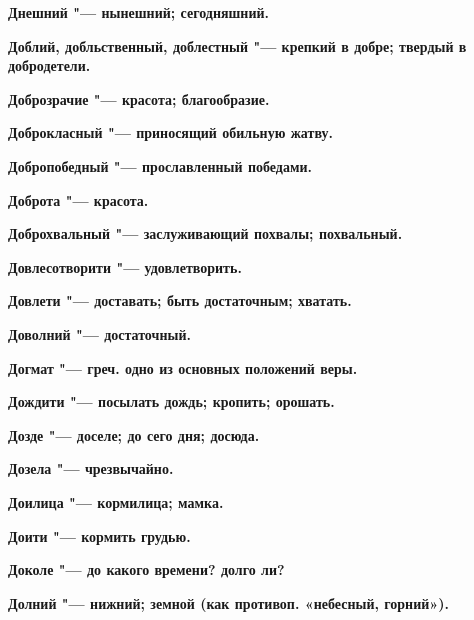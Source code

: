 \begin{mymulticols}{2}
\bfseries Днешний\normalfont{} "--- нынешний; сегодняшний. 




\bfseries Доблий, добльственный, доблестный\normalfont{} "--- крепкий в добре; твердый в добродетели. 




\bfseries Доброзрачие\normalfont{} "--- красота; благообразие. 




\bfseries Доброкласный\normalfont{} "--- приносящий обильную жатву. 




\bfseries Добропобедный\normalfont{} "--- прославленный победами. 




\bfseries Доброта\normalfont{} "--- красота. 




\bfseries Доброхвальный\normalfont{} "--- заслуживающий похвалы; похвальный. 




\bfseries Довлесотворити\normalfont{} "--- удовлетворить. 




\bfseries Довлети\normalfont{} "--- доставать; быть достаточным; хватать. 




\bfseries Доволний\normalfont{} "--- достаточный. 




\bfseries Догмат\normalfont{} "--- греч. одно из основных положений веры. 




\bfseries Дождити\normalfont{} "--- посылать дождь; кропить; орошать. 




\bfseries Дозде\normalfont{} "--- доселе; до сего дня; досюда. 




\bfseries Дозела\normalfont{} "--- чрезвычайно. 




\bfseries Доилица\normalfont{} "--- кормилица; мамка. 




\bfseries Доити\normalfont{} "--- кормить грудью. 




\bfseries Доколе\normalfont{} "--- до какого времени? долго ли? 




\bfseries Долний\normalfont{} "--- нижний; земной (как противоп. «небесный, горний»). 





\end{mymulticols}

